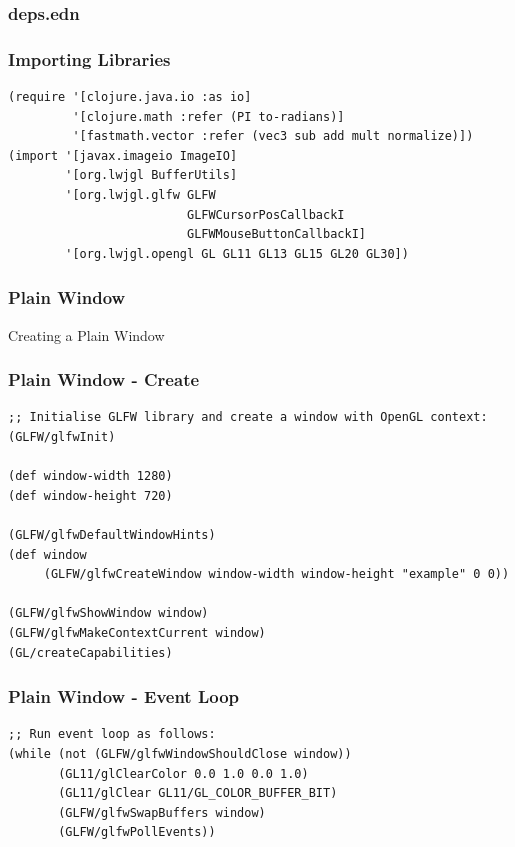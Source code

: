\documentclass[aspectratio=169,11pt,xcolor=dvipsnames]{beamer}
\begin{document}
\begin{frame}[fragile]
  \frametitle{deps.edn}
  
\end{frame}

\begin{frame}[fragile]
  \frametitle{Importing Libraries}
  \begin{verbatim}
(require '[clojure.java.io :as io]
         '[clojure.math :refer (PI to-radians)]
         '[fastmath.vector :refer (vec3 sub add mult normalize)])
(import '[javax.imageio ImageIO]
        '[org.lwjgl BufferUtils]
        '[org.lwjgl.glfw GLFW
                         GLFWCursorPosCallbackI
                         GLFWMouseButtonCallbackI]
        '[org.lwjgl.opengl GL GL11 GL13 GL15 GL20 GL30])
  \end{verbatim}
\end{frame}

\begin{frame}
  \frametitle{Plain Window}
  \begin{center}
    \begin{huge}
      Creating a Plain Window
    \end{huge}
  \end{center}
\end{frame}

\begin{frame}[fragile]
  \frametitle{Plain Window {-} Create}
  \begin{verbatim}
;; Initialise GLFW library and create a window with OpenGL context:
(GLFW/glfwInit)

(def window-width 1280)
(def window-height 720)

(GLFW/glfwDefaultWindowHints)
(def window
     (GLFW/glfwCreateWindow window-width window-height "example" 0 0))

(GLFW/glfwShowWindow window)
(GLFW/glfwMakeContextCurrent window)
(GL/createCapabilities)
  \end{verbatim}
\end{frame}

\begin{frame}[fragile]
  \frametitle{Plain Window {-} Event Loop}
  \begin{verbatim}
;; Run event loop as follows:
(while (not (GLFW/glfwWindowShouldClose window))
       (GL11/glClearColor 0.0 1.0 0.0 1.0)
       (GL11/glClear GL11/GL_COLOR_BUFFER_BIT)
       (GLFW/glfwSwapBuffers window)
       (GLFW/glfwPollEvents))
  \end{verbatim}
\end{frame}
\end{document}
